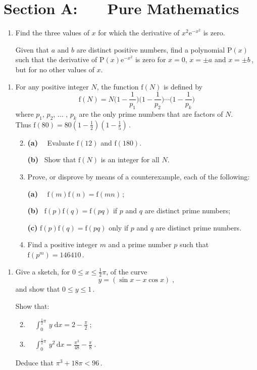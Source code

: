 \documentclass[a4, 11pt]{report}
\newlength{\qspace}
\newcounter{qnumber}
\newenvironment{question}%
 {\vspace{\qspace}
  \begin{enumerate}[\bfseries 1\quad][10]%
    \setcounter{enumi}{\value{qnumber}}%
    \item%
 }
{
  \end{enumerate}
  \filbreak
  \stepcounter{qnumber}
 }
\newenvironment{questionparts}[1][1]%
 {
  \begin{enumerate}[\bfseries (i)]%
    \setcounter{enumii}{#1}
    \addtocounter{enumii}{-1}
    \setlength{\itemsep}{5mm}
    \setlength{\parskip}{8pt}
 }
 {
  \end{enumerate}
 }
\def\d{{\mathrm d}}
\def\e{{\mathrm e}}
\def\f{{\mathrm f}}
\def\P{{\mathrm P}}
\def\le{\leqslant}
\begin{document}
\setcounter{page}{2}

 
\section*{Section A: \ \ \ Pure Mathematics}

\begin{question}
Find the three values of $x$ for which the derivative 
of $x^2 \e^{-x^2}$ is zero.

Given that $a$ and $b$ are
distinct positive numbers,
find a  polynomial $\P(x)$ such that the derivative of
$\P(x)\e^{-x^2}$ is zero for 
$x=0$, $x=\pm a$ and $x=\pm b\,$, but for no other values of $x$.
\end{question}

\begin{question}
For any positive integer $N$, the function $\f(N)$ is defined by
\[
\f(N) = N\Big(1-\frac1{p_1}\Big)\Big(1-\frac1{p_2}\Big)
\cdots\Big(1-\frac1{p_k}\Big)
\]
where $p_1$, $p_2$, $\dots$ , $p_k$ are the only prime numbers that are factors
 of $N$. 
\\
Thus $\f(80)=80(1-\frac12)(1-\frac15)\,$.


\begin{questionparts}
\item
\textbf{(a)} \ \  Evaluate $\f(12)$  and $\f(180)$. 

\textbf{(b)} \  
Show that $\f(N)$ is an integer for all $N$.
\item Prove, or disprove by means of a counterexample, 
each of the following:

\textbf{(a)} \ \   $\f(m) \f(n) = \f(mn)\,$;


\textbf{(b)} \ $\f(p) \f(q) = \f(pq)$ if $p$ and $q$ are distinct prime numbers;

\textbf{(c)}
  $\f(p) \f(q) = \f(pq)$ only if $p$ and $q$ are distinct prime numbers.
\item Find 
a positive integer $m$ and a prime number $p$ such that
$\f(p^m) = 146410\,$.
\end{questionparts}
\end{question}

\begin{question}
Give a sketch, for  
$0 \le x \le \frac{1}{2}\pi$, of the curve
$$
y = (\sin x - x\cos x)\;,
$$
and show that $0\le y \le 1\,$.

Show that:
\begin{questionparts}
\item \ \ $\displaystyle
\int_0^{\frac{1}{2}\pi}\,y\;\d x = 2 -\frac \pi 2 \;;
$
\item \ \ $\displaystyle
\int_0^{\frac{1}{2}\pi}\,y^2\,\d x = \frac{\pi^3}{48}-\frac \pi 8 \;.
$
\end{questionparts}

Deduce that
$\pi^3 +18 \pi< 96\,$.
\end{question}
\end{document}
